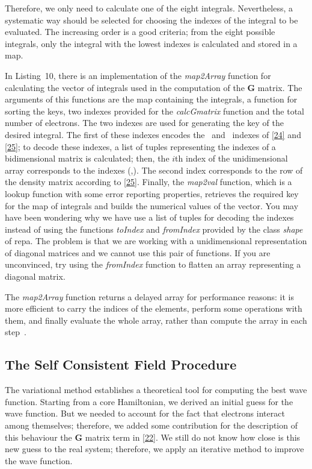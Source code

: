 \documentclass{tmr}
\begin{document}
Therefore, we only need to calculate one of the eight integrals. Nevertheless, a systematic
way should be selected for choosing the indexes of the integral to be
evaluated. The increasing order is a good criteria; from the eight possible integrals,
only the integral with the lowest indexes is calculated and stored in a map. 

In Listing~10, there is an implementation of the \textit{map2Array} function for
calculating the vector of integrals used in the computation of the \textbf{G} matrix. The
arguments of this functions are the map containing the integrals, a function 
for sorting the keys, two indexes provided for the \textit{calcGmatrix} function
and the total number of electrons. The two indexes are used for generating
the key of the desired integral. The first of these indexes encodes the \textalpha\ and 
\textbeta\ indexes of \eqref{24} and \eqref{25}; to decode these indexes, a list
of tuples representing the indexes of a bidimensional matrix is calculated;
then, the $i$th index of the unidimensional array corresponds to the indexes (\textalpha,\textbeta).
The second index corresponds to the row of the density matrix according to \eqref{25}. Finally,
the \textit{map2val} function, which is a lookup function with some error reporting properties, 
retrieves the required key for the map of integrals and builds the numerical values of the vector.
You may have been wondering why we have use a list of tuples for decoding 
the indexes instead of using the functions \textit{toIndex} and \textit{fromIndex}
provided by the class \textit{shape} of repa. The problem is that we are working with a
unidimensional representation of diagonal matrices and we cannot use this pair of functions.
If you are unconvinced, try using the \textit{fromIndex} function to flatten an array representing
a diagonal matrix.

The \textit{map2Array} function returns a delayed array for performance reasons: it is more efficient
to carry the indices of the elements, perform some operations with them, and finally
evaluate the whole array, rather than compute the array in each step~\cite{repa}.

\subsection{The Self Consistent Field Procedure}

The variational method establishes a theoretical tool for computing the best
wave function. Starting from a core Hamiltonian, we derived an initial guess
for the wave function. But we needed to account for the fact that electrons interact among themselves;
therefore, we added some contribution for the description of this behaviour
the \textbf{G} matrix term in \eqref{22}. We still do not know how
close is this new guess to the real system; therefore, we apply an iterative method
to improve the wave function.
\end{document}
